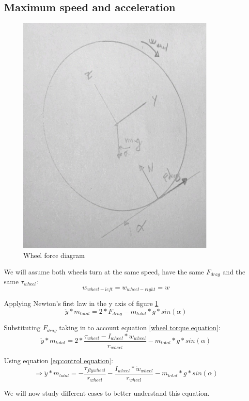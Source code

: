 \subsection{Maximum speed and acceleration}
\begin{figure}
	\centering
	\includegraphics[width=10cm]{img/wheel_diagram_drag.jpg}
	\caption{Wheel force diagram}
	\label{fig:Wheel forward force diagram}
\end{figure}
We will assume both wheels turn at the same speed, have the same $F_{drag}$ and the same $\tau_{wheel}$:
\[ w_{wheel-left} = w_{wheel-right} = w \]

Applying Newton's first law in the y axis of figure \ref{fig:Wheel forward force diagram}
\[\ddot{y}*m_{total} = 2 * F_{drag} - m_{total} * g * sin(\alpha)\]

Substituting $F_{drag}$ taking in to account equation \ref{wheel torque equation}:
\[\ddot{y}*m_{total} = 2 * \frac{\tau_{wheel} - I_{wheel} * \dot{w}_{wheel}}{r_{wheel}} - m_{total} * g * sin(\alpha)\]

Using equation \ref{eq:control equation}:
\begin{equation}\label{eq of acceleration}
    \Rightarrow  \ddot{y}*m_{total} = - \frac{\tau_{flywheel}}{r_{wheel}} - \frac{I_{wheel} * \dot{w}_{wheel}}{r_{wheel}} - m_{total} * g * sin(\alpha)
\end{equation}


We will now study different cases to better understand this equation.
